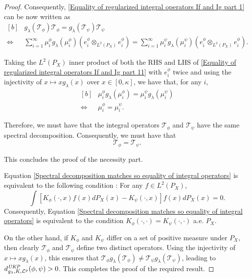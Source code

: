 \documentclass{article} %
\newcommand{\repone}{\phi}
\newcommand{\reptwo}{\psi}
\newcommand{\Tone}{\mathcal{T}_{\repone}}
\newcommand{\Ttwo}{\mathcal{T}_{\reptwo}}
\newcommand{\gl}{g_{\lambda}}
\newcommand{\LPtwo}{L^{2}(P_{X})}
\newcommand{\metricstname}{UKP }
\newcommand{\dLpgl}{d_{\gl,K,\mathcal{L}^{p}}^{\emph{\metricstname}}}
\theoremstyle{plain}
\begin{document}
\begin{proof}
    Consequently, \eqref{Equality of regularized integral operators If and Ig part 1} can be now written as
    \begin{equation}\label{Equality of regularized integral operators If and Ig part 11}
        \begin{aligned}[b]
            &\gl(\Tone)\Tone = \gl(\Ttwo)\Ttwo\\
            \iff & \sum_{i=1}^{\infty} \mu_{i}^{\repone}\gl(\mu_{i}^{\repone}) \left(e_{i}^{\repone} \otimes_{\LPtwo} e_{i}^{\repone}\right) = \sum_{i=1}^{\infty} \mu_{i}^{\reptwo} \gl(\mu_{i}^{\reptwo}) \left(e_{i}^{\repone} \otimes_{\LPtwo} e_{i}^{\repone}\right).
        \end{aligned}
    \end{equation}

    Taking the $\LPtwo$ inner product of both the RHS and LHS of \eqref{Equality of regularized integral operators If and Ig part 11} with $e_{i}^{\repone}$ twice and using the injectivity of $x \mapsto x\gl(x)$ over $x \in [0,\kappa]$, we have that, for any $i$,
    \begin{equation*}
        \begin{aligned}[b]
            &\mu_{i}^{\repone} \gl(\mu_{i}^{\repone}) = \mu_{i}^{\reptwo} \gl(\mu_{i}^{\reptwo})\\
            \iff & \mu_{i}^{\repone} = \mu_{i}^{\reptwo}.
        \end{aligned}
    \end{equation*}

    Therefore, we must have that the integral operators $\Tone$ and $\Ttwo$ have the same spectral decomposition. Consequently, we must have that \begin{equation}\label{Spectral decomposition matches so equality of integral operators}
        \Tone = \Ttwo.
    \end{equation}

    This concludes the proof of the necessity part.   

    Equation \ref{Spectral decomposition matches so equality of integral operators} is equivalent to the following condition : For any $f \in \LPtwo$, 
    \begin{equation}\label{Spectral decomposition matches so equality of inclusion adjoint operators}
        \int \left[K_{\repone}(\cdot,x) f(x) dP_{X}(x) - K_{\reptwo}(\cdot,x)\right] f(x) dP_{X}(x) = 0.
    \end{equation}
    Consequently, Equation \ref{Spectral decomposition matches so equality of integral operators} is equivalent to the condition $K_{\repone}(\cdot,\cdot) = K_{\reptwo}(\cdot,\cdot)$ a.e. $P_{X}$. 

    On the other hand, if $K_{\repone}$ and $K_{\reptwo}$ differ on a set of positive measure under $P_X$, then clearly $\Tone$ and $\Ttwo$ define two distinct operators. Using the injectivity of $x \mapsto x\gl(x)$, this ensures that $\Tone \gl(\Tone) \neq \Ttwo \gl(\Ttwo)$, leading to $\dLpgl(\repone,\reptwo)>0$. This completes the proof of the required result.
\end{proof}
\end{document}
